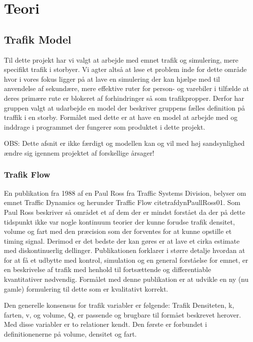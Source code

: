 \chapter{Teori}\label{Teori}

\section{Trafik Model}

Til dette projekt har vi valgt at arbejde med emnet trafik og simulering, mere specifikt trafik i storbyer. Vi agter altså at løse et problem inde for dette område hvor i vores fokus ligger på at lave en simulering der kan hjælpe med til anvendelse af sekundære, mere effektive ruter for person- og varebiler i tilfælde at deres primære rute er blokeret af forhindringer så som trafikpropper. Derfor har gruppen valgt at udarbejde en model der beskriver gruppens fælles definition på traffik i en storby. Formålet med dette er at have en model at arbejde med og inddrage i programmet der fungerer som produktet i dette projekt.

OBS: Dette afsnit er ikke færdigt og modellen kan og vil med høj sandsynlighed ændre sig igennem projektet af forskellige årsager! 

\subsection{Trafik Flow}

En publikation fra 1988 af en Paul Ross fra Traffic Systems Division, belyser om emnet Traffic Dynamics og herunder Traffic Flow cite{trafdyn}{PaullRoss01}. Som Paul Ross beskriver så området et af dem der er mindst forstået da der på dette tidspunkt ikke var nogle kontinuum teorier der kunne forudse trafik densitet, volume og fart med den præcision som der forventes for at kunne opstille et timing signal. Derimod er det bedste der kan gøres er at lave et cirka estimate med diskontinuerlig dellinger. Publikationen forklarer i større detalje hvordan at for at få et udbytte med kontrol, simulation og en general forståelse for emnet, er en beskrivelse af trafik med henhold til fortsættende og differentiable kvantitativer nødvendig. Formålet med denne publikation er at udvikle en ny (nu gamle) formulering til dette som er kvalitativt korrekt. 

Den generelle konsensus for trafik variabler er følgende: Trafik Densiteten, k, farten, v, og volume, Q, er passende og brugbare til formået beskrevet herover. Med disse variabler er to relationer kendt. Den første er forbundet i definitionenerne på volume, densitet og fart.

